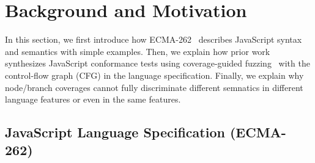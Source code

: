 \section{Background and Motivation}\label{sec:motivation}

In this section, we first introduce how ECMA-262~\cite{es13} describes
JavaScript syntax and semantics with simple examples.
%
Then, we explain how prior work synthesizes JavaScript conformance tests using
coverage-guided fuzzing~\cite{afl} with the control-flow graph (CFG) in the
language specification.
%
Finally, we explain why node/branch coverages cannot fully discriminate
different semnatics in different language features or even in the same features.

\subsection{JavaScript Language Specification (ECMA-262)}


